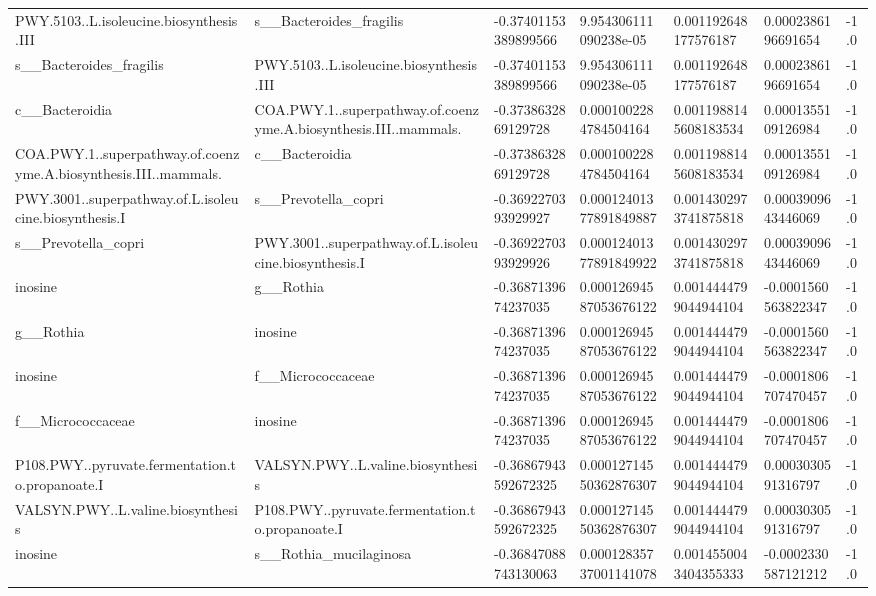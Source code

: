 \begin{longtable}{lllllll}
PWY.5103..L.isoleucine.biosynthesis.III & s\_\_Bacteroides\_fragilis & -0.37401153389899566 & 9.954306111090238e-05 & 0.001192648177576187 & 0.0002386196691654 & -1.0 \\
s\_\_Bacteroides\_fragilis & PWY.5103..L.isoleucine.biosynthesis.III & -0.37401153389899566 & 9.954306111090238e-05 & 0.001192648177576187 & 0.0002386196691654 & -1.0 \\
c\_\_Bacteroidia & COA.PWY.1..superpathway.of.coenzyme.A.biosynthesis.III..mammals. & -0.3738632869129728 & 0.0001002284784504164 & 0.0011988145608183534 & 0.0001355109126984 & -1.0 \\
COA.PWY.1..superpathway.of.coenzyme.A.biosynthesis.III..mammals. & c\_\_Bacteroidia & -0.3738632869129728 & 0.0001002284784504164 & 0.0011988145608183534 & 0.0001355109126984 & -1.0 \\
PWY.3001..superpathway.of.L.isoleucine.biosynthesis.I & s\_\_Prevotella\_copri & -0.3692270393929927 & 0.00012401377891849887 & 0.0014302973741875818 & 0.0003909643446069 & -1.0 \\
s\_\_Prevotella\_copri & PWY.3001..superpathway.of.L.isoleucine.biosynthesis.I & -0.3692270393929926 & 0.00012401377891849922 & 0.0014302973741875818 & 0.0003909643446069 & -1.0 \\
inosine & g\_\_Rothia & -0.3687139674237035 & 0.00012694587053676122 & 0.0014444799044944104 & -0.0001560563822347 & -1.0 \\
g\_\_Rothia & inosine & -0.3687139674237035 & 0.00012694587053676122 & 0.0014444799044944104 & -0.0001560563822347 & -1.0 \\
inosine & f\_\_Micrococcaceae & -0.3687139674237035 & 0.00012694587053676122 & 0.0014444799044944104 & -0.0001806707470457 & -1.0 \\
f\_\_Micrococcaceae & inosine & -0.3687139674237035 & 0.00012694587053676122 & 0.0014444799044944104 & -0.0001806707470457 & -1.0 \\
P108.PWY..pyruvate.fermentation.to.propanoate.I & VALSYN.PWY..L.valine.biosynthesis & -0.36867943592672325 & 0.00012714550362876307 & 0.0014444799044944104 & 0.0003030591316797 & -1.0 \\
VALSYN.PWY..L.valine.biosynthesis & P108.PWY..pyruvate.fermentation.to.propanoate.I & -0.36867943592672325 & 0.00012714550362876307 & 0.0014444799044944104 & 0.0003030591316797 & -1.0 \\
inosine & s\_\_Rothia\_mucilaginosa & -0.36847088743130063 & 0.00012835737001141078 & 0.0014550043404355333 & -0.0002330587121212 & -1.0 \\

\end{longtable}
